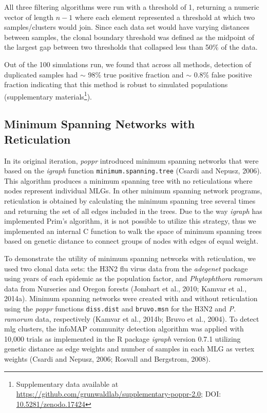 \documentclass{frontiersSCNS} %
\begin{document}
All three filtering algorithms were run with a threshold of 1, returning
a numeric vector of length \(n - 1\) where each element represented a
threshold at which two samples/clusters would join. Since each data set
would have varying distances between samples, the clonal boundary
threshold was defined as the midpoint of the largest gap between two
thresholds that collapsed less than 50\% of the data.

Out of the 100 simulations run, we found that across all methods,
detection of duplicated samples had \(\sim\) 98\% true positive fraction
and \(\sim\) 0.8\% false positive fraction indicating that this method
is robust to simulated populations (supplementary materials\footnote{Supplementary
  data available at
  \url{https://github.com/grunwaldlab/supplementary-poppr-2.0}; DOI:
  \href{http://dx.doi.org/10.5281/zenodo.17424}{10.5281/zenodo.17424}}).

\subsection*{Minimum Spanning Networks with
Reticulation}\label{minimum-spanning-networks-with-reticulation}

In its original iteration, \emph{poppr} introduced minimum spanning
networks that were based on the \emph{igraph} function
\texttt{minimum.spanning.tree} (Csardi and Nepusz, 2006). This algorithm
produces a minimum spanning tree with no reticulations where nodes
represent individual MLGs. In other minimum spanning network programs,
reticulation is obtained by calculating the minimum spanning tree
several times and returning the set of all edges included in the trees.
Due to the way \emph{igraph} has implemented Prim's algorithm, it is not
possible to utilize this strategy, thus we implemented an internal C
function to walk the space of minimum spanning trees based on genetic
distance to connect groups of nodes with edges of equal weight.

To demonstrate the utility of minimum spanning networks with
reticulation, we used two clonal data sets: the H3N2 flu virus data from
the \emph{adegenet} package using years of each epidemic as the
population factor, and \emph{Phytophthora ramorum} data from Nurseries
and Oregon forests (Jombart et al., 2010; Kamvar et al., 2014a). Minimum
spanning networks were created with and without reticulation using the
\emph{poppr} functions \texttt{diss.dist} and \texttt{bruvo.msn} for the
H3N2 and \emph{P. ramorum} data, respectively (Kamvar et al., 2014b;
Bruvo et al., 2004). To detect mlg clusters, the infoMAP community
detection algorithm was applied with 10,000 trials as implemented in the
R package \emph{igraph} version 0.7.1 utilizing genetic distance as edge
weights and number of samples in each MLG as vertex weights (Csardi and
Nepusz, 2006; Rosvall and Bergstrom, 2008).
\end{document}

